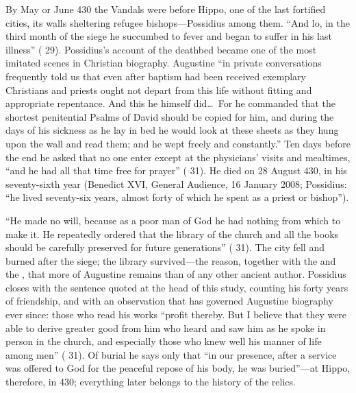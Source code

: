 By May or June 430 the Vandals were before Hippo, one of the last fortified
cities, its walls sheltering refugee bishops---Possidius among them. ``And
lo, in the third month of the siege he succumbed to fever and began to
suffer in his last illness'' ( 29). Possidius's account of the
deathbed became one of the most imitated scenes in Christian biography.
Augustine ``in private conversations frequently told us that even after
baptism had been received exemplary Christians and priests ought not depart
from this life without fitting and appropriate repentance. And this he
himself did\ldots\ For he commanded that the shortest penitential Psalms of
David should be copied for him, and during the days of his sickness as he
lay in bed he would look at these sheets as they hung upon the wall and read
them; and he wept freely and constantly.'' Ten days before the end he asked
that no one enter except at the physicians' visits and mealtimes, ``and he
had all that time free for prayer'' ( 31). He died on 28 August
430, in his seventy-sixth year (Benedict XVI, General Audience, 16 January
2008; Possidius: ``he lived seventy-six years, almost forty of which he
spent as a priest or bishop'').

``He made no will, because as a poor man of God he had nothing from which
to make it. He repeatedly ordered that the library of the church and all the
books should be carefully preserved for future generations'' (
31). The city fell and burned after the siege; the library survived---the
reason, together with the  and the ,
that more of Augustine remains than of any other ancient author. Possidius
closes with the sentence quoted at the head of this study, counting his
forty years of friendship, and with an observation that has governed
Augustine biography ever since: those who read his works ``profit thereby.
But I believe that they were able to derive greater good from him who heard
and saw him as he spoke in person in the church, and especially those who
knew well his manner of life among men'' ( 31). Of burial he says
only that ``in our presence, after
a service was offered to God for the peaceful repose of his body, he was
buried''---at Hippo, therefore, in 430; everything later belongs to the
history of the relics.
